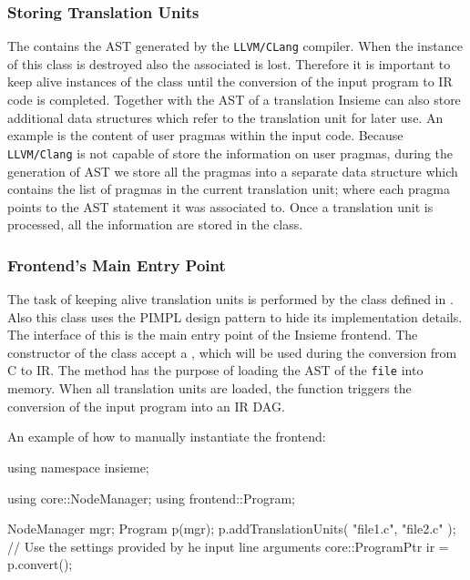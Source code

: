 \subsubsection{Storing Translation Units}

The  contains the AST generated by the {\tt LLVM/CLang}
compiler. When the instance of this class is destroyed also the associated
 is lost. Therefore it is important to keep alive
instances of the  class until the conversion of the input
program to IR code is completed. Together with the AST of a translation Insieme
can also store additional data structures which refer to the translation unit
for later use. An example is the content of user pragmas within the input code.
Because {\tt LLVM/Clang} is not capable of store the information on user
pragmas, during the generation of AST we store all the pragmas into a separate
data structure  which contains the list of
pragmas in the current translation unit; where each pragma points to the AST
statement it was associated to. Once a translation unit is processed, all the
information are stored in the  class. 

\subsubsection{Frontend's Main Entry Point}

The task of keeping alive translation units is performed by the
 class defined in . Also this
class uses the PIMPL design pattern to hide its implementation details. The
interface of this is the main entry point of the Insieme frontend. The
constructor of the  class accept a , which
will be used during the conversion from C to IR.  The method
 has the purpose of loading
the AST of the {\tt file} into memory. When all translation units are loaded,
the  function triggers the conversion of the input program into
an IR DAG. 

An example of how to manually instantiate the frontend: 
\begin{srcCode}
using namespace insieme;

using core::NodeManager;
using frontend::Program;

NodeManager mgr;
Program p(mgr);
p.addTranslationUnits( {"file1.c", "file2.c"} );
// Use the settings provided by he input line arguments 
core::ProgramPtr ir = p.convert();
\end{srcCode}

